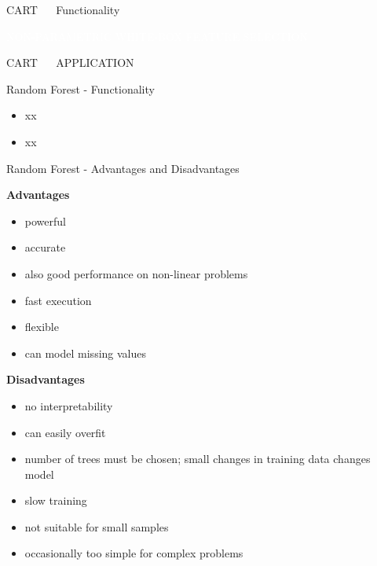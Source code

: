 \documentclass[11pt,compress,t,notes=noshow, xcolor=table]{beamer}
\begin{document}
\begin{frame}{\textcolor{gray!80}{CART} ~~ Functionality}
\vfill

\colorbox{gray!80}{\textcolor{white}{NON-PARAMETRIC}} 
\colorbox{gray!80}{\textcolor{white}{WHITE-BOX}} 
\colorbox{gray!80}{\textcolor{white}{FEATURE SELECTION}}

\end{frame}


\begin{frame}{\textcolor{gray!60}{CART} ~~ APPLICATION}
\end{frame}




\begin{frame}{Random Forest - Functionality}

\begin{itemize}
\item xx
\item xx
\end{itemize}


\end{frame}

\begin{frame}{Random Forest - Advantages and Disadvantages}

\textbf{Advantages}
\begin{itemize}
\item powerful
\item accurate
\item also good performance on non-linear problems
\item fast execution
\item flexible 
\item can model missing values
\end{itemize}


\textbf{Disadvantages}
\begin{itemize}
\item no interpretability
\item can easily overfit
\item number of trees must be chosen; small changes in training data changes model 
\item slow training
\item not suitable for small samples
\item occasionally too simple for complex problems
\end{itemize}
\end{frame}
\end{document}
